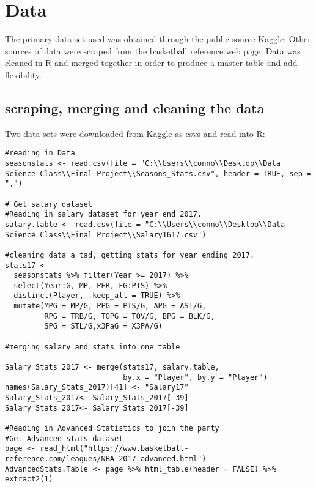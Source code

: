 \documentclass[12pt,english]{article}
\begin{document}
\section{Data}\label{sec:data}
The primary data set used was obtained through the public source Kaggle. Other sources of data were scraped from the  basketball reference web page. Data was cleaned in R and merged together in order to produce a master table and add flexibility.
\subsection{scraping, merging and cleaning the data}
Two data sets were downloaded from Kaggle as csvs and read into R:
\begin{singlespace}
\begin{lstlisting}
#reading in Data
seasonstats <- read.csv(file = "C:\\Users\\conno\\Desktop\\Data Science Class\\Final Project\\Seasons_Stats.csv", header = TRUE, sep = ",")

# Get salary dataset 
#Reading in salary dataset for year end 2017.
salary.table <- read.csv(file = "C:\\Users\\conno\\Desktop\\Data Science Class\\Final Project\\Salary1617.csv")

#cleaning data a tad, getting stats for year ending 2017.
stats17 <- 
  seasonstats %>% filter(Year >= 2017) %>% 
  select(Year:G, MP, PER, FG:PTS) %>% 
  distinct(Player, .keep_all = TRUE) %>% 
  mutate(MPG = MP/G, PPG = PTS/G, APG = AST/G, 
         RPG = TRB/G, TOPG = TOV/G, BPG = BLK/G, 
         SPG = STL/G,x3PaG = X3PA/G) 

#merging salary and stats into one table

Salary_Stats_2017 <- merge(stats17, salary.table,
                           by.x = "Player", by.y = "Player")
names(Salary_Stats_2017)[41] <- "Salary17"
Salary_Stats_2017<- Salary_Stats_2017[-39]
Salary_Stats_2017<- Salary_Stats_2017[-39]

#Reading in Advanced Statistics to join the party
#Get Advanced stats dataset
page <- read_html("https://www.basketball-reference.com/leagues/NBA_2017_advanced.html")
AdvancedStats.Table <- page %>% html_table(header = FALSE) %>% extract2(1)



\end{lstlisting}
\end{singlespace}
\end{document}
